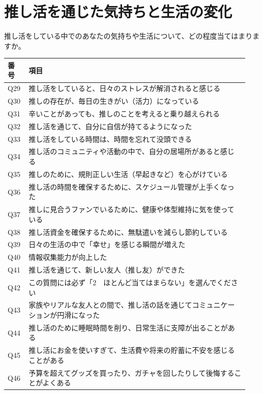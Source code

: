 \section*{推し活を通じた気持ちと生活の変化}
\noindent 推し活をしている中でのあなたの気持ちや生活について、どの程度当てはまりますか。\\
\begin{longtable}{@{}p{0.08\linewidth}p{0.86\linewidth}@{}}
\toprule 番号 & 項目 \\ \midrule \endhead \bottomrule \endfoot
Q29 & 推し活をしていると、日々のストレスが解消されると感じる \\
Q30 & 推しの存在が、毎日の生きがい（活力）になっている \\
Q31 & 辛いことがあっても、推しのことを考えると乗り越えられる \\
Q32 & 推し活を通じて、自分に自信が持てるようになった \\
Q33 & 推し活をしている時間は、時間を忘れて没頭できる \\
Q34 & 推し活のコミュニティや活動の中で、自分の居場所があると感じる \\
Q35 & 推しのために、規則正しい生活（早起きなど）を心がけている \\
Q36 & 推し活の時間を確保するために、スケジュール管理が上手くなった \\
Q37 & 推しに見合うファンでいるために、健康や体型維持に気を使っている \\
Q38 & 推し活資金を確保するために、無駄遣いを減らし節約している \\
Q39 & 日々の生活の中で「幸せ」を感じる瞬間が増えた \\
Q40 & 情報収集能力が向上した \\
Q41 & 推し活を通じて、新しい友人（推し友）ができた \\
Q42 & この質問には必ず「2　ほとんど当てはまらない」を選んでください \\
Q43 & 家族やリアルな友人との間で、推し活の話を通じてコミュニケーションが円滑になった \\
Q44 & 推し活のために睡眠時間を削り、日常生活に支障が出ることがある \\
Q45 & 推し活にお金を使いすぎて、生活費や将来の貯蓄に不安を感じることがある \\
Q46 & 予算を超えてグッズを買ったり、ガチャを回したりして後悔することがよくある \\

\end{longtable}
